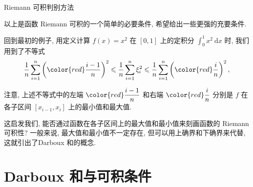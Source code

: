 
\begin{frame}{Riemann 可积判别方法}

以上是函数 Riemann 可积的一个简单的必要条件, 希望给出一些\alert{更强的充要条件}.

\pause
\vspace{1em}

回到最初的例子, 用定义计算 $f(x) = x^2$ 在 $[0,1]$ 上的定积分 $\int_0^1 x^2 ~ \mathrm{d} x$ 时, 我们用到了不等式
\[
\dfrac{1}{n} \sum_{i=1}^n \left( {\color{red} \dfrac{i-1}{n}} \right)^2 \leqslant \dfrac{1}{n} \sum_{i=1}^n \xi_i^2 \leqslant \dfrac{1}{n} \sum_{i=1}^n \left( {\color{red}\dfrac{i}{n}} \right)^2,
\]

\pause

\alert{注意}, 上述不等式中的左端 $\color{red} \dfrac{i-1}{n}$ 和右端 $\color{red} \dfrac{i}{n}$ 分别是 $f$ 在各子区间 $[x_{i-1}, x_i]$ 上的\alert{最小值}和\alert{最大值}.

\pause
\vspace{1em}

这启发我们, 能否通过函数在各子区间上的最大值和最小值来刻画函数的 Riemann 可积性?
一般来说, 最大值和最小值不一定存在, 但可以用\alert{上确界}和\alert{下确界}来代替, 这就引出了\alert{Darboux 和}的概念.

\end{frame}


\section{Darboux 和与可积条件}


